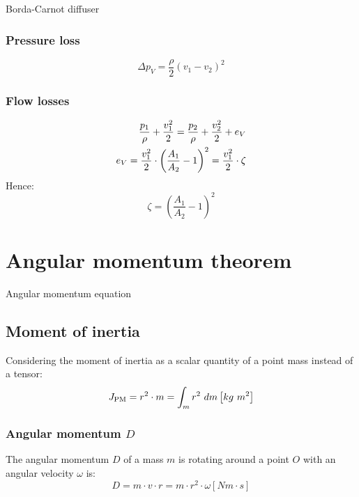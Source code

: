 \documentclass{article}
\begin{document}
\newpage
\begin{multicols}{2}
\setlength{\columnsep}{1pt}

\begin{examplebox}{Borda-Carnot diffuser}
    \subsubsection{Pressure loss}
    \begin{equation}
        \Delta p_V = \frac{\rho}{2}\left(v_1 - v_2\right)^2
    \end{equation}

    \subsubsection{Flow losses}
    \vspace{-0.3cm}
    \begin{align}
        \frac{p_1}{\rho} + \frac{v_1^2}{2} = \frac{p_2}{\rho} + \frac{v_2^2}{2} + e_V \notag \\
        e_V = \frac{v_1^2}{2} \cdot \left(\frac{A_1}{A_2}-1\right)^2 = \frac{v_1^2}{2}\cdot \zeta
    \end{align}
    Hence:
    \begin{equation}
        \zeta = \left(\frac{A_1}{A_2}-1\right)^2
    \end{equation}
\end{examplebox}

\section{Angular momentum theorem}
\begin{theorybox}{Angular momentum equation}
    \subsection{Moment of inertia}
    Considering the moment of inertia as a scalar quantity of a point mass
    instead of a tensor:
    \begin{equation}
        J_{\rm PM} = r^2\cdot m = \int_m r^2\ dm \left[kg\ m^2\right]
    \end{equation}

    \subsubsection{Angular momentum $D$}
    The angular momentum $D$ of a mass $m$ is rotating around a point $O$ with an
    angular velocity $\omega$ is:
    \begin{equation}
        D = m\cdot v\cdot r = m\cdot r^2 \cdot \omega \left[Nm\cdot s\right]
    \end{equation}


\end{theorybox}
\end{multicols}
\end{document}
